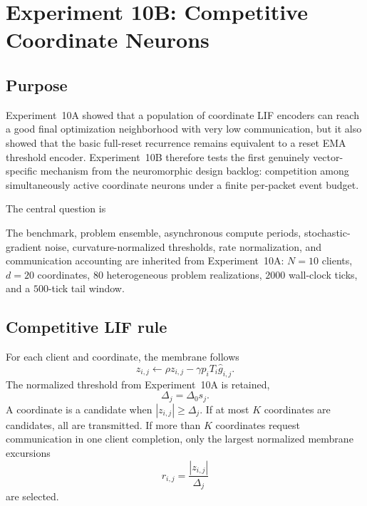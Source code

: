 \section{Experiment 10B: Competitive Coordinate Neurons}
\label{sec:exp10b}

\subsection{Purpose}

Experiment~10A showed that a population of coordinate LIF encoders can reach a good final optimization neighborhood with very low communication, but it also showed that the basic full-reset recurrence remains equivalent to a reset EMA threshold encoder. Experiment~10B therefore tests the first genuinely vector-specific mechanism from the neuromorphic design backlog: competition among simultaneously active coordinate neurons under a finite per-packet event budget.

The central question is
\begin{center}
\end{center}

The benchmark, problem ensemble, asynchronous compute periods, stochastic-gradient noise, curvature-normalized thresholds, rate normalization, and communication accounting are inherited from Experiment~10A: $N=10$ clients, $d=20$ coordinates, $80$ heterogeneous problem realizations, $2000$ wall-clock ticks, and a $500$-tick tail window.

\subsection{Competitive LIF rule}

For each client and coordinate, the membrane follows
\begin{equation}
  z_{i,j}\leftarrow\rho z_{i,j}-\gamma p_iT_i\hat g_{i,j}.
\end{equation}
The normalized threshold from Experiment~10A is retained,
\begin{equation}
  \Delta_j=\Delta_0s_j.
\end{equation}
A coordinate is a candidate when $|z_{i,j}|\geq\Delta_j$. If at most $K$ coordinates are candidates, all are transmitted. If more than $K$ coordinates request communication in one client completion, only the largest normalized membrane excursions
\begin{equation}
  r_{i,j}=\frac{|z_{i,j}|}{\Delta_j}
\end{equation}
are selected.

